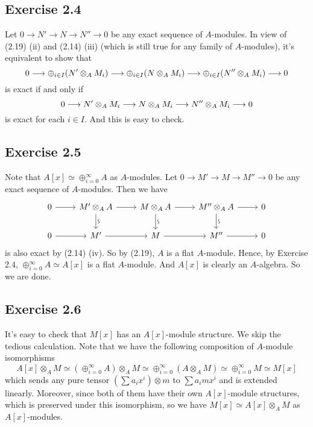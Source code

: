 \documentclass[../A&M.tex]{subfiles}
\begin{document}
\subsection*{Exercise 2.4}

Let $0 \to N' \to N \to N'' \to 0$ be any exact sequence of $A$-modules. In view of (2.19) (ii) and (2.14) (iii) (which is still true for any family of $A$-modules), it's equivalent to show that
$$
0 \longrightarrow \oplus_{i \in I} (N' \otimes_A M_i) \longrightarrow \oplus_{i \in I} (N \otimes_A M_i) \longrightarrow \oplus_{i \in I} (N'' \otimes_A M_i) \longrightarrow 0
$$
is exact if and only if
$$
0 \longrightarrow N' \otimes_A M_i \longrightarrow N \otimes_A M_i \longrightarrow N'' \otimes_A M_i \longrightarrow 0
$$
is exact for each $i\in I$. And this is easy to check.

\subsection*{Exercise 2.5}

Note that $A[x] \simeq \oplus_{i=0}^\infty A$ as $A$-modules. Let $0 \to M' \to M \to M'' \to 0$ be any exact sequence of $A$-modules. Then we have
$$
\begin{tikzcd}
0 \arrow{r} & M' \otimes_A A \arrow{r} \visoarrow{d} & M \otimes_A A \arrow{r} \visoarrow{d} & M'' \otimes_A A \arrow{r} \visoarrow{d} & 0 \\ 
0 \arrow{r} & M' \arrow{r} & M \arrow{r} & M'' \arrow[r] & 0
\end{tikzcd}
$$
is also exact by (2.14) (iv). So by (2.19), $A$ is a flat $A$-module. Hence, by Exercise 2.4, $ \oplus_{i=0}^\infty A \simeq A[x]$ is a flat $A$-module. And $A[x]$ is clearly an $A$-algebra. So we are done.

\subsection*{Exercise 2.6}

It's easy to check that $M[x]$ has an $A[x]$-module structure. We skip the tedious calculation. Note that we have the following composition of $A$-module isomorphisms
$$
A[x] \otimes_A M
\simeq (\oplus_{i=0}^\infty A) \otimes_A M
\simeq \oplus_{i=0}^\infty (A \otimes_A M)
\simeq \oplus_{i=0}^\infty M
\simeq M[x] 
$$
which sends any pure tensor $(\sum a_ix^i) \otimes m$ to $\sum a_imx^i$ and is extended linearly. Moreover, since both of them have their own $A[x]$-module structures, which is preserved under this isomorphism, so we have $M[x] \simeq A[x] \otimes_A M$ as $A[x]$-modules.
\end{document}
